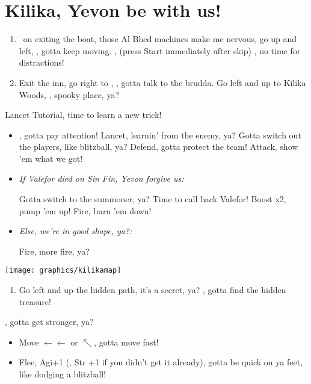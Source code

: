 \chapter{Kilika, Yevon be with us!}

\begin{enumerate}
    \item \sd\ on exiting the boat, those Al Bhed machines make me nervous, go up and left, \sd, gotta keep moving. \skippablefmv[2:00], (press Start immediately after skip) \sd, no time for distractions!
    \item Exit the inn, go right to \wakka, \sd, gotta talk to the brudda. Go left and up to Kilika Woods, \sd, spooky place, ya?
\end{enumerate}
\begin{battle}{Lancet Tutorial, time to learn a new trick!}
    \begin{itemize}
        \item \sd, gotta pay attention!
        \kimahrif Lancet, learnin' from the enemy, ya?
        \switch{\kimahri}{\wakka} Gotta switch out the players, like blitzball, ya?
        \wakkaf Defend, gotta protect the team!
        \tidusf Attack, show 'em what we got!
        \item \textit{If Valefor died on Sin Fin, Yevon forgive us:}
        \begin{itemize}
            \switch{\lulu}{\yuna} Gotta switch to the summoner, ya?
            \summon{\valefor} Time to call back Valefor!
            \valeforf Boost x2, pump 'em up!
            \valeforf Fire, burn 'em down!
        \end{itemize}
        \item \textit{Else, we're in good shape, ya?:}
        \begin{itemize}
            \luluf Fire, more fire, ya?
        \end{itemize}
    \end{itemize}
\end{battle}
\texttt{[image: graphics/kilikamap]}
\begin{enumerate}[resume]
    \item Go left and up the hidden path, it's a secret, ya? , gotta find the hidden treasure!
\end{enumerate}
\begin{spheregrid}
    \begin{itemize}
        \tidusf, gotta get stronger, ya?
        \begin{itemize}
            \item Move $\leftarrow\leftarrow$ or $\nwarrow$, gotta move fast!
            \item Flee, Agi+1 (, Str +1 if you didn't get it already), gotta be quick on ya feet, like dodging a blitzball!
        \end{itemize}
    \end{itemize}
\end{spheregrid}
